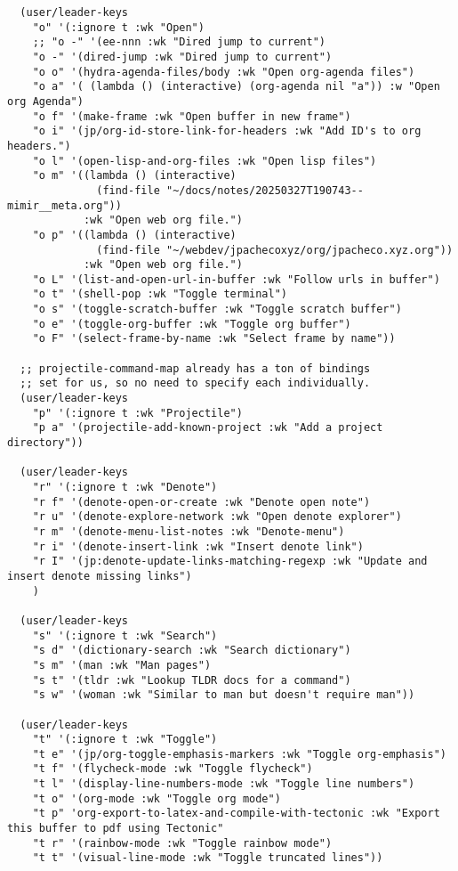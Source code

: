 \documentclass[11pt]{article}
\begin{document}
\begin{verbatim}
  (user/leader-keys
    "o" '(:ignore t :wk "Open")
    ;; "o -" '(ee-nnn :wk "Dired jump to current")
    "o -" '(dired-jump :wk "Dired jump to current")
    "o o" '(hydra-agenda-files/body :wk "Open org-agenda files")
    "o a" '( (lambda () (interactive) (org-agenda nil "a")) :w "Open org Agenda")
    "o f" '(make-frame :wk "Open buffer in new frame")
    "o i" '(jp/org-id-store-link-for-headers :wk "Add ID's to org headers.")
    "o l" '(open-lisp-and-org-files :wk "Open lisp files")
    "o m" '((lambda () (interactive)
              (find-file "~/docs/notes/20250327T190743--mimir__meta.org")) 
            :wk "Open web org file.")
    "o p" '((lambda () (interactive)
              (find-file "~/webdev/jpachecoxyz/org/jpacheco.xyz.org")) 
            :wk "Open web org file.")
    "o L" '(list-and-open-url-in-buffer :wk "Follow urls in buffer")
    "o t" '(shell-pop :wk "Toggle terminal")
    "o s" '(toggle-scratch-buffer :wk "Toggle scratch buffer")
    "o e" '(toggle-org-buffer :wk "Toggle org buffer")
    "o F" '(select-frame-by-name :wk "Select frame by name"))

  ;; projectile-command-map already has a ton of bindings 
  ;; set for us, so no need to specify each individually.
  (user/leader-keys
    "p" '(:ignore t :wk "Projectile")
    "p a" '(projectile-add-known-project :wk "Add a project directory"))

  (user/leader-keys
    "r" '(:ignore t :wk "Denote")
    "r f" '(denote-open-or-create :wk "Denote open note")
    "r u" '(denote-explore-network :wk "Open denote explorer")
    "r m" '(denote-menu-list-notes :wk "Denote-menu")
    "r i" '(denote-insert-link :wk "Insert denote link")
    "r I" '(jp:denote-update-links-matching-regexp :wk "Update and insert denote missing links")
    )

  (user/leader-keys
    "s" '(:ignore t :wk "Search")
    "s d" '(dictionary-search :wk "Search dictionary")
    "s m" '(man :wk "Man pages")
    "s t" '(tldr :wk "Lookup TLDR docs for a command")
    "s w" '(woman :wk "Similar to man but doesn't require man"))

  (user/leader-keys
    "t" '(:ignore t :wk "Toggle")
    "t e" '(jp/org-toggle-emphasis-markers :wk "Toggle org-emphasis")
    "t f" '(flycheck-mode :wk "Toggle flycheck")
    "t l" '(display-line-numbers-mode :wk "Toggle line numbers")
    "t o" '(org-mode :wk "Toggle org mode")
    "t p" 'org-export-to-latex-and-compile-with-tectonic :wk "Export this buffer to pdf using Tectonic"
    "t r" '(rainbow-mode :wk "Toggle rainbow mode")
    "t t" '(visual-line-mode :wk "Toggle truncated lines"))


\end{verbatim}
\end{document}
